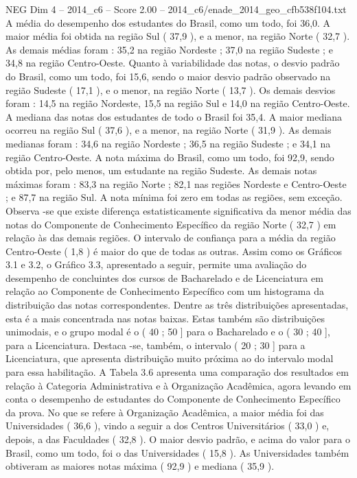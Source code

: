 \begin{textsample}{NEG Dim 4 – 2014\_c6 – Score 2.00 – 2014\_c6/enade\_2014\_geo\_cfb538f104.txt}
A média do desempenho dos estudantes do Brasil, como um todo, foi 36,0.
A maior média foi obtida na região Sul ( 37,9 ), e a menor, na região Norte ( 32,7 ).
As demais médias foram : 35,2 na região Nordeste ; 37,0 na região Sudeste ; e 34,8 na região Centro-Oeste.
Quanto à variabilidade das notas, o desvio padrão do Brasil, como um todo, foi 15,6, sendo o maior desvio padrão observado na região Sudeste ( 17,1 ), e o menor, na região Norte ( 13,7 ).
Os demais desvios foram : 14,5 na região Nordeste, 15,5 na região Sul e 14,0 na região Centro-Oeste.
A mediana das notas dos estudantes de todo o Brasil foi 35,4.
A maior mediana ocorreu na região Sul ( 37,6 ), e a menor, na região Norte ( 31,9 ).
As demais medianas foram : 34,6 na região Nordeste ; 36,5 na região Sudeste ; e 34,1 na região Centro-Oeste.
A nota máxima do Brasil, como um todo, foi 92,9, sendo obtida por, pelo menos, um estudante na região Sudeste.
As demais notas máximas foram : 83,3 na região Norte ; 82,1 nas regiões Nordeste e Centro-Oeste ; e 87,7 na região Sul.
A nota mínima foi zero em todas as regiões, sem exceção.
Observa -se que existe diferença estatisticamente significativa da menor média das notas do Componente de Conhecimento Específico da região Norte ( 32,7 ) em relação às das demais regiões.
O intervalo de confiança para a média da região Centro-Oeste ( 1,8 ) é maior do que de todas as outras.
Assim como os Gráficos 3.1 e 3.2, o Gráfico 3.3, apresentado a seguir, permite uma avaliação do desempenho de concluintes dos cursos de Bacharelado e de Licenciatura em relação ao Componente de Conhecimento Específico com um histograma da distribuição das notas correspondentes.
Dentre as três distribuições apresentadas, esta é a mais concentrada nas notas baixas.
Estas também são distribuições unimodais, e o grupo modal é o ( 40 ; 50 ] para o Bacharelado e o ( 30 ; 40 ], para a Licenciatura.
Destaca -se, também, o intervalo ( 20 ; 30 ] para a Licenciatura, que apresenta distribuição muito próxima ao do intervalo modal para essa habilitação.
A Tabela 3.6 apresenta uma comparação dos resultados em relação à Categoria Administrativa e à Organização Acadêmica, agora levando em conta o desempenho de estudantes do Componente de Conhecimento Específico da prova.
No que se refere à Organização Acadêmica, a maior média foi das Universidades ( 36,6 ), vindo a seguir a dos Centros Universitários ( 33,0 ) e, depois, a das Faculdades ( 32,8 ).
O maior desvio padrão, e acima do valor para o Brasil, como um todo, foi o das Universidades ( 15,8 ).
As Universidades também obtiveram as maiores notas máxima ( 92,9 ) e mediana ( 35,9 ).

\end{textsample}
